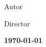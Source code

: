 \vfill

{
\begin{center}
\selectfont
\large{\color{epsc:oscuro}Autor}\\
\textbf{\color{epsc:medio} \AutorTFG }
\end{center}
}


\vfill

{
\begin{center}
\selectfont
\large{\color{epsc:oscuro} Director }\\
\textbf{\color{epsc:medio} \DirectorUno }
\end{center}
}

\vfill

{
\begin{center}
\selectfont
\textbf{\color{epsc:verde} \monthyeardate\today}
\end{center}
}

\endgroup  %

\endinput

